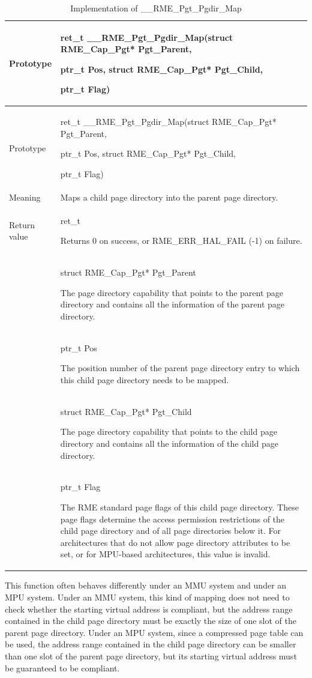 \begin{xltabular}{\textwidth}{@{}>{\hsize\raggedright\arraybackslash}X>{\hsize\raggedright\arraybackslash}X@{}}
\caption{Implementation of \_\_RME\_Pgt\_Pgdir\_Map}\label{tab:7-81-rme-pgt-pgdir-map-implementation}\\
\toprule
Prototype\strut
 & ret\_t \_\_RME\_Pgt\_Pgdir\_Map(struct RME\_Cap\_Pgt* Pgt\_Parent,

ptr\_t Pos, struct RME\_Cap\_Pgt* Pgt\_Child,

ptr\_t Flag)\strut
\tabularnewline
\endfirsthead
\toprule
Prototype\strut
 & ret\_t \_\_RME\_Pgt\_Pgdir\_Map(struct RME\_Cap\_Pgt* Pgt\_Parent,

ptr\_t Pos, struct RME\_Cap\_Pgt* Pgt\_Child,

ptr\_t Flag)\strut
\tabularnewline
\midrule
\endhead
\bottomrule
\endlastfoot
Meaning & Maps a child page directory into the parent page directory.\tabularnewline
Return value\strut
 & ret\_t

Returns 0 on success, or RME\_ERR\_HAL\_FAIL (-1) on failure.\strut
\tabularnewline
{} & struct RME\_Cap\_Pgt* Pgt\_Parent

The page directory capability that points to the parent page directory and contains all the information of the parent page directory.\strut
\tabularnewline
\strut
 & ptr\_t Pos

The position number of the parent page directory entry to which this child page directory needs to be mapped.\strut
\tabularnewline
\strut
 & struct RME\_Cap\_Pgt* Pgt\_Child

The page directory capability that points to the child page directory and contains all the information of the child page directory.\strut
\tabularnewline
\strut
 & ptr\_t Flag

The RME standard page flags of this child page directory. These page flags determine the access permission restrictions of the child page directory and of all page directories below it. For architectures that do not allow page directory attributes to be set, or for MPU-based architectures, this value is invalid.\strut
\tabularnewline
\end{xltabular}
\nopagebreak[4]

This function often behaves differently under an MMU system and under an MPU system. Under an MMU system, this kind of mapping does not need to check whether the starting virtual address is compliant, but the address range contained in the child page directory must be exactly the size of one slot of the parent page directory. Under an MPU system, since a compressed page table can be used, the address range contained in the child page directory can be smaller than one slot of the parent page directory, but its starting virtual address must be guaranteed to be compliant.

